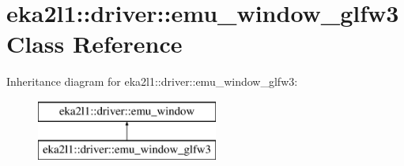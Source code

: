 \hypertarget{classeka2l1_1_1driver_1_1emu__window__glfw3}{}\section{eka2l1\+:\+:driver\+:\+:emu\+\_\+window\+\_\+glfw3 Class Reference}
\label{classeka2l1_1_1driver_1_1emu__window__glfw3}
Inheritance diagram for eka2l1\+:\+:driver\+:\+:emu\+\_\+window\+\_\+glfw3\+:\begin{figure}[H]
\begin{center}
\leavevmode
\includegraphics[height=2.000000cm]{classeka2l1_1_1driver_1_1emu__window__glfw3}
\end{center}
\end{figure}
